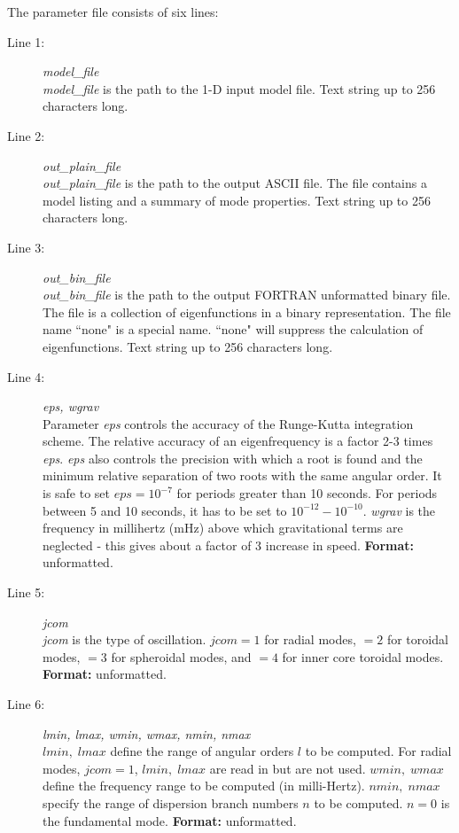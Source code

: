 \documentclass[11pt]{article}
\begin{document}
\noindent The parameter file consists of six lines:
\begin{description}
\item[Line 1:] {\it model\_file} \\
{\it model\_file} is the path to the 1-D input model file. Text string up to 
256 characters long.
\item[Line 2:] {\it out\_plain\_file} \\
{\it out\_plain\_file} is the path to the output ASCII file. The file contains a model
listing  and a summary of mode properties. Text string up to 256 
characters long.
\item[Line 3:] {\it out\_bin\_file} \\
{\it out\_bin\_file} is the  path to the output FORTRAN unformatted binary file.
The file is a collection of eigenfunctions in a binary representation. 
The file name ``none" is a special name. ``none" will suppress the calculation 
of eigenfunctions. Text string up to 256 characters long.
\item[Line 4:] {\it eps, wgrav} \\
Parameter {\it eps} controls the accuracy of the 
Runge-Kutta integration scheme. The relative accuracy of an eigenfrequency 
is a factor 2-3 times {\it eps}. {\it eps} also controls the precision with 
which a root is found and the minimum relative separation of two roots 
with the same angular order. It is safe to set $eps = 10^{-7}$ for periods
greater than 10 seconds. For periods between 5 and 10 seconds, it has to be
set to $10^{-12} - 10^{-10}$. {\it wgrav} is the frequency in millihertz (mHz)
above which gravitational terms are neglected - this gives about a factor 
of 3 increase in speed. {\bf Format:} unformatted.
\item[Line 5:] {\it jcom} \\
{\it jcom} is the type of oscillation.  $jcom=1$ for radial modes, $=2$ for
toroidal modes, $=3$ for spheroidal modes, and $=4$ for inner core toroidal
modes. {\bf Format:} unformatted.
\item[Line 6:] {\it lmin, lmax, wmin, wmax, nmin, nmax} \\
$lmin,\; lmax$ define the range 
of angular orders $l$ to be computed. For radial modes, $jcom=1$,
$lmin,\; lmax$ are read in but are not used. $wmin,\;  wmax$
define the frequency range to be computed (in milli-Hertz). $nmin,\;nmax$ 
specify the range of dispersion branch numbers $n$ to be computed. $n = 0$ is the 
fundamental mode. {\bf Format:} unformatted.
\end{description}
%
%
\end{document}
